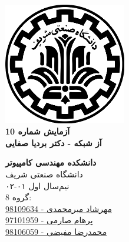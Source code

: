 \documentclass{article}
\begin{document}
\begin{titlepage}
	\begin{center}
		\vspace{0.2cm}
		
		\includegraphics[width=0.4\textwidth]{sharif.png}\\
		\vspace{0.2cm}
		\textbf{ \Huge{آزمایش شماره 10}}\\
		\vspace{0.25cm}
		\textbf{ \Large{آز شبکه - دکتر بردیا صفایی}}
		\vspace{0.2cm}
		
		
		\large \textbf{دانشکده مهندسی کامپیوتر}\\\vspace{0.1cm}
		\large   دانشگاه صنعتی شریف\\\vspace{0.2cm}
		\large   ﻧﯿﻢ‌سال اول ۰۱-۰۲ \\\vspace{0.10cm}
		\large{ گروه 8:}\\
		\large{\href{mailto:mehrshad.mirmohammadi@gmail.com}{مهرشاد میرمحمدی - 98109634}}\\
		\large{\href{mailto:parhaamsaremi@gmail.com}{پرهام صارمی - 97101959}}\\
		\large{\href{mailto:mofayezi.m@gmail.com}{محمدرضا مفیضی - 98106059}}\\
	\end{center}
\end{titlepage}

\newpage

\pagestyle{fancy}
\fancyhf{}
\fancyfoot{}
\setlength{\headheight}{59pt}
\cfoot{\thepage}
\end{document}
